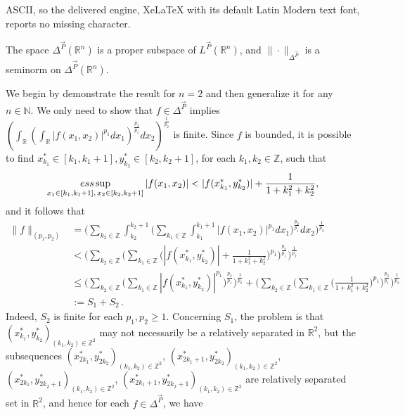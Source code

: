 \documentclass[10pt,a4paper]{amsart}
\def\NN{\mathbb N}
\def\RR{\mathbb R}
\def\ZZ{\mathbb Z}
\def\esssup{\mathop{\textup{ess}\sup}}
\renewenvironment{proof}{{\raggedright \bfseries Proof.}}{\qedwhite}
\newcommand{\vc}[1]{\overrightarrow{#1}}
\begin{document}
ASCII, so the delivered engine, XeLaTeX with its default Latin Modern text font, reports no missing character.
\begin{prop} \label{p1}
    The space $\Delta^{\vc{P}}(\RR^n)$ is a proper subspace of $L^{\overrightarrow{P}}(\RR^n)$, and $\|\cdot\|_{\Delta^{\vc{P}}}$ is a seminorm on $\Delta^{\vc{P}}(\RR^n)$.
\end{prop}

\begin{proof}
    We begin by demonstrate the result for $n=2$ and then generalize it for any $n \in \NN$.
    We only need to show that $f \in \Delta^{\overrightarrow{P}}$ implies $\displaystyle \left(\int_{\RR}\left(\int_{\RR} |f(x_1,x_2)|^{p_1}dx_1 \right)^{\frac{p_2}{p_1}}dx_2 \right)^{\frac{1}{p_2}}$ is finite. Since $f$ is bounded, it is possible to find $x_{k_1} ^{*}\in [k_1,k_1+1],y_{k_2}^{*}\in [k_2,k_2+1]$, for each $k_1,k_2 \in \ZZ$, such that 
    \[ \esssup_{x_1 \in [k_1,k_1+1], \, x_2 \in [k_2,k_2+1]} |f(x_1, x_2)| < |f(x_{k_1}^{*},y_{k_2}^{*})| + \frac{1}{1+k_1^2+k_2^2},\]
    and it follows that
    \begin{align*}
        \|f\|_{(p_1,p_2)} & =\Bigg(\sum_{k_2 \in\ZZ}\int_{k_2}^{k_2+1}\Bigg(\sum_{k_1 \in \ZZ} \int_{k_1}^{k_1+1}|f(x_1,x_2)|^{p_1}dx_1\Bigg)^{\frac{p_2}{p_1}}dx_2\Bigg)^{\frac{1}{p_2}}\\
		& < \Bigg( \sum_{k_2 \in \ZZ}\Bigg(\sum_{k_1 \in \ZZ}\Bigg(|f(x_{k_1}^{*},y_{k_2}^{*})|+ \frac{1}{1+k_1^2+k_2^2}\Bigg)^{p_1}\Bigg)^{\frac{p_2}{p_1}}\Bigg)^{\frac{1}{p_2}}\\
		& \leq \Bigg(\sum_{k_2 \in \ZZ}\Bigg( \sum_{k_1 \in \ZZ}|f(x_{k_1}^{*},y_{k_2}^{*})|^{p_1}\Bigg)^{\frac{p_2}{p_1}}\Bigg)^{\frac{1}{p_2}}+ \Bigg(\sum_{k_2 \in \ZZ}\Bigg(\sum_{k_1 \in \ZZ} \Bigg( \frac{1}{1+k_1^2+k_2^2}\Bigg)^{p_1}\Bigg)^{\frac{p_2}{p_1}}\Bigg)^{\frac{1}{p_2}}  \\
		&:= S_1+S_2 \hspace{2pt}.
    \end{align*}
    Indeed, $S_2$ is finite for each $p_1,p_2\geq 1$. Concerning $S_1$, the problem is that $(x_{k_1}^{*},y_{k_2}^{*})_ {(k_1,k_2) \in \ZZ^2}$ may not necessarily be a relatively separated in $\RR^2$, but the subsequences $(x_{2k_1}^{*},y_{2k_2}^{*})_ {(k_1,k_2) \in \ZZ^2}$, $(x_{2k_1+1}^{*},y_{2k_2}^{*})_ {(k_1,k_2) \in \ZZ^2}$, $(x_{2k_1}^{*},y_{2k_2+1}^{*})_ {(k_1,k_2) \in \ZZ^2}$, $(x_{2k_1+1}^{*},y_{2k_2+1}^{*})_ {(k_1,k_2) \in \ZZ^2}$ are relatively separated set in $\RR^2$, and hence for each $f \in \Delta^{\overrightarrow{P}}$, we have
    \begin{align*} 

\end{align*}
\end{proof}
\end{document}
